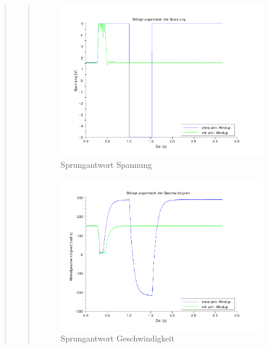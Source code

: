 \begin{quote}
\begin{quote}
        \begin{figure}[H]
        \centering
            \includegraphics[scale=0.8, trim = 0.5cm 0.5cm 2cm 0.5cm,
            clip]{./Bilder/windup_sprungantwort_Spannung}    
            \caption{Sprungantwort Spannung}
        \end{figure}        
        
        \begin{figure}[H]
        \centering
            \includegraphics[scale=0.8, trim = 0.5cm 0.5cm 2cm 0.5cm,
            clip]{./Bilder/windup_sprungantwort_Geschwindigkeit}    
            \caption{Sprungantwort Geschwindigkeit}
        \end{figure}


\end{quote}
\end{quote}

